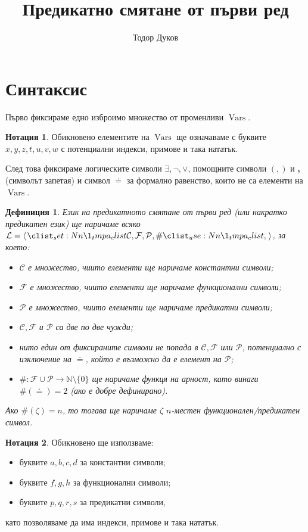 \documentclass[12pt]{article}
\title{Предикатно смятане от първи ред}
\author{Тодор Дуков}
\date{}
\newcommand{\N}{\mathbb{N}}
\newcommand{\vars}{\operatorname{Vars}}
\newcommand{\calL}{\mathcal{L}}
\newcommand{\calF}{\mathcal{F}}
\newcommand{\calP}{\mathcal{P}}
\newcommand{\calC}{\mathcal{C}}
\newtheorem*{definition}{Дефиниция}
\theoremstyle{definition}
\newtheorem*{notation}{Нотация}
\begin{document}
\maketitle

\section{Синтаксис}

Първо фиксираме едно изброимо множество от променливи $\vars$.
\begin{notation}
Обикновено елементите на $\vars$ ще означаваме с буквите $x, y, z, t, u, v, w$ с потенциални индекси, примове и така нататък.
\end{notation}
След това фиксираме логическите символи $\exists, \neg, \lor$, помощните символи $(, )$ и \textbf{,} (символът запетая) и символ $\doteq$ за формално равенство, които не са елементи на $\vars$.

\begin{definition}
    Език на предикатното смятане от първи ред (или накратко предикатен език) ще наричаме всяко $\calL = \opair{\calC, \calF, \calP, \#}$, за което:
    \begin{itemize}
        \item $\calC$ е множество, чиито елементи ще наричаме константни символи;
        \item $\calF$ е множество, чиито елементи ще наричаме функционални символи;
        \item $\calP$ е множество, чиито елементи ще наричаме предикатни символи;
        \item $\calC, \calF$ и $\calP$ са две по две чужди;
        \item нито един от фиксираните символи не попада в $\calC, \calF$ или $\calP$, потенциално с изключение на $\doteq$, който е възможно да е елемент на $\calP$;
        \item $\# : \calF \cup \calP \rightarrow \N \setminus \{ 0 \}$ ще наричаме функця на арност, като винаги $\#(\doteq) = 2$ (ако е добре дефинирано).
    \end{itemize}
    Ако $\#(\zeta) = n$, то тогава ще наричаме $\zeta$ $n$-местен функционален/предикатен символ.
\end{definition}

\newpage

\begin{notation}
    Обикновено ще използваме:
    \begin{itemize}
        \item буквите $a, b, c, d$ за константни символи;
        \item буквите $f, g, h$ за функционални символи;
        \item буквите $p, q, r, s$ за предикатни символи,
    \end{itemize}
    като позволяваме да има индекси, примове и така нататък.
\end{notation}
\end{document}

